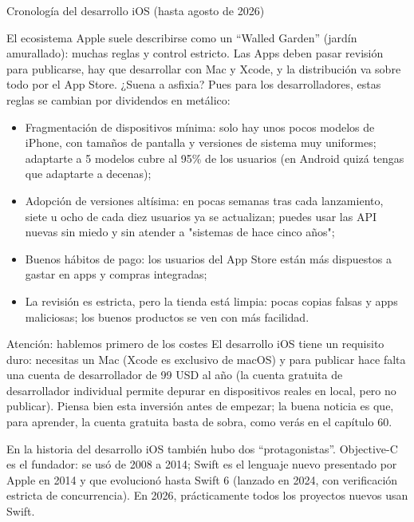 \begin{center}\small\color{gray}Cronología del desarrollo iOS (hasta agosto de 2026)\end{center}


El ecosistema Apple suele describirse como un “Walled Garden” (jardín amurallado): muchas reglas y control estricto. Las Apps deben pasar revisión para publicarse, hay que desarrollar con Mac y Xcode, y la distribución va sobre todo por el App Store. ¿Suena a asfixia? Pues para los desarrolladores, estas reglas se cambian por dividendos en metálico:

\begin{itemize}
  \item Fragmentación de dispositivos mínima: solo hay unos pocos modelos de iPhone, con tamaños de pantalla y versiones de sistema muy uniformes; adaptarte a 5 modelos cubre al 95\% de los usuarios (en Android quizá tengas que adaptarte a decenas);
  \item Adopción de versiones altísima: en pocas semanas tras cada lanzamiento, siete u ocho de cada diez usuarios ya se actualizan; puedes usar las API nuevas sin miedo y sin atender a "sistemas de hace cinco años";
  \item Buenos hábitos de pago: los usuarios del App Store están más dispuestos a gastar en apps y compras integradas;
  \item La revisión es estricta, pero la tienda está limpia: pocas copias falsas y apps maliciosas; los buenos productos se ven con más facilidad.
\end{itemize}

\begin{tcbwarn}{Atención: hablemos primero de los costes}
El desarrollo iOS tiene un requisito duro: necesitas un Mac (Xcode es exclusivo de macOS) y para publicar hace falta una cuenta de desarrollador de 99 USD al año (la cuenta gratuita de desarrollador individual permite depurar en dispositivos reales en local, pero no publicar). Piensa bien esta inversión antes de empezar; la buena noticia es que, para aprender, la cuenta gratuita basta de sobra, como verás en el capítulo 60.

\end{tcbwarn}


En la historia del desarrollo iOS también hubo dos “protagonistas”. Objective-C es el fundador: se usó de 2008 a 2014; Swift es el lenguaje nuevo presentado por Apple en 2014 y que evolucionó hasta Swift 6 (lanzado en 2024, con verificación estricta de concurrencia). En 2026, prácticamente todos los proyectos nuevos usan Swift.

